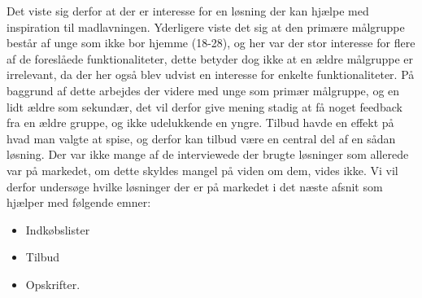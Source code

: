 Det viste sig derfor at der er interesse for en løsning der kan hjælpe med inspiration til madlavningen. 
Yderligere viste det sig at den primære målgruppe består af unge som ikke bor hjemme (18-28), og her var der stor interesse for flere af de foreslåede funktionaliteter, dette betyder dog ikke at en ældre målgruppe er irrelevant, da der her også blev udvist en interesse for enkelte funktionaliteter.
På baggrund af dette arbejdes der videre med unge som primær målgruppe, og en lidt ældre som sekundær, det vil derfor give mening stadig at få noget feedback fra en ældre gruppe, og ikke udelukkende en yngre.
Tilbud havde en effekt på hvad man valgte at spise, og derfor kan tilbud være en central del af en sådan løsning.
Der var ikke mange af de interviewede der brugte løsninger som allerede var på markedet, om dette skyldes mangel på viden om dem, vides ikke.
Vi vil derfor undersøge hvilke løsninger der er på markedet i det næste afsnit som hjælper med følgende emner:


\begin{itemize}
	\item Indkøbslister
	\item Tilbud
	\item Opskrifter.
\end{itemize}
